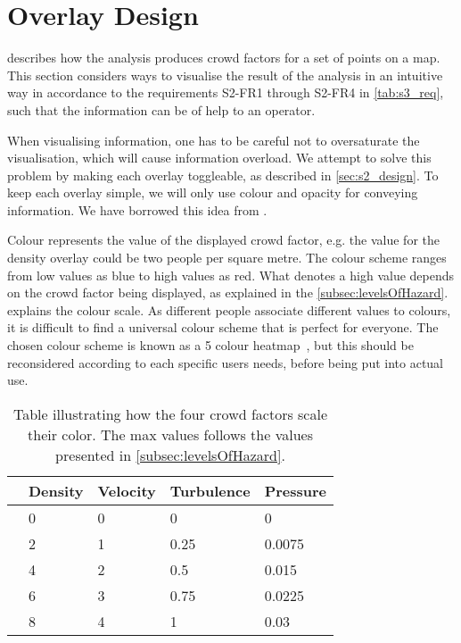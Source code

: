 \section{Overlay Design} \label{sec:s4_overlay}

 describes how the analysis produces crowd factors for a set of points on a map. This section considers ways to visualise the result of the analysis in an intuitive way in accordance to the requirements S2-FR1 through S2-FR4 in \cref{tab:s3_req}, such that the information can be of help to an operator.

When visualising information, one has to be careful not to oversaturate the visualisation, which will cause information overload. We attempt to solve this problem by making each overlay toggleable, as described in \cref{sec:s2_design}. To keep each overlay simple, we will only use colour and opacity for conveying information. We have borrowed this idea from \citet{wirz2012inferring}.

Colour represents the value of the displayed crowd factor, e.g. the value for the density overlay could be two people per square metre. The colour scheme ranges from low values as blue to high values as red. What denotes a high value depends on the crowd factor being displayed, as explained in the \cref{subsec:levelsOfHazard}.  explains the colour scale. As different people associate different values to colours, it is difficult to find a universal colour scheme that is perfect for everyone. The chosen colour scheme is known as a 5 colour heatmap~\cite{fiveheatmap}, but this should be reconsidered according to each specific users needs, before being put into actual use.

\begin{table}[htbp]
    \centering
    \begin{tabular}{l l l l l} \toprule
                        & Density & Velocity & Turbulence & Pressure \\ \midrule
    \cellcolor{low}     & 0       & 0        & 0          & 0         \\
    \cellcolor{medium}  & 2       & 1        & 0.25       & 0.0075         \\
    \cellcolor{high}    & 4       & 2        & 0.5        & 0.015         \\
    \cellcolor{higher}  & 6       & 3        & 0.75       & 0.0225         \\
    \cellcolor{highest} & 8       & 4        & 1          & 0.03         \\ \bottomrule
    \end{tabular}
    \caption[Crowd factor scale]{Table illustrating how the four crowd factors scale their color. The max values follows the values presented in \cref{subsec:levelsOfHazard}.}
    \label{tab:color_scale}
\end{table}

